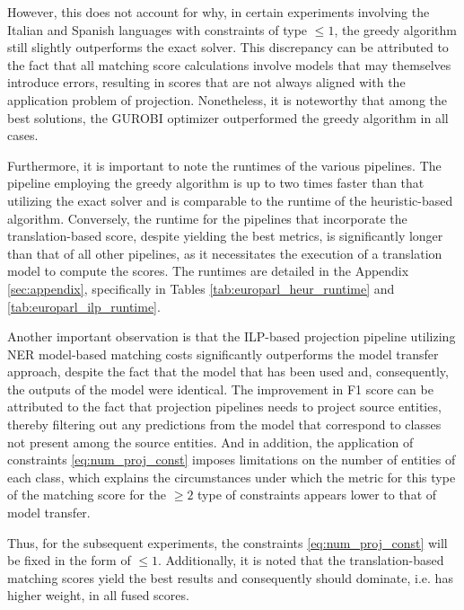 However, this does not account for why, in certain experiments involving the Italian and
Spanish languages with constraints of type \( \leq 1 \), the greedy algorithm still
slightly outperforms the exact solver. This discrepancy can be attributed to the fact that all
matching score calculations involve models that may themselves introduce errors,
resulting in scores that are not always aligned with the application problem of projection.
Nonetheless, it is noteworthy that among the best solutions, the GUROBI optimizer
outperformed the greedy algorithm in all cases.

Furthermore, it is important to note the runtimes of the various pipelines.
The pipeline employing the greedy algorithm is up to two times faster than that
utilizing the exact solver and is comparable to the runtime of the heuristic-based
algorithm. Conversely, the runtime for the pipelines that incorporate the
translation-based score, despite yielding the best metrics, is significantly longer
than that of all other pipelines, as it necessitates the execution of a translation
model to compute the scores. The runtimes are detailed in the Appendix \ref{sec:appendix}, specifically
in Tables \ref{tab:europarl_heur_runtime} and \ref{tab:europarl_ilp_runtime}.

Another important observation is that the ILP-based projection pipeline utilizing NER
model-based matching costs significantly outperforms the model transfer approach,
despite the fact that the model that has been used and, consequently, the outputs of the model
were identical. The improvement in F1 score can be attributed to the fact that projection
pipelines needs to project source entities, thereby filtering out any predictions from the model
that correspond to classes not present among the source entities. And in addition, the
application of constraints \eqref{eq:num_proj_const} imposes limitations on the number
of entities of each class, which explains the circumstances under which the metric
for this type of the matching score for the \( \geq 2 \) type of constraints appears
lower to that of model transfer.

Thus, for the subsequent experiments, the constraints \eqref{eq:num_proj_const} will
be fixed in the form of \( \leq 1 \). Additionally, it is noted that the translation-based
matching scores yield the best results and consequently should dominate, i.e. has higher weight,
in all fused scores.

